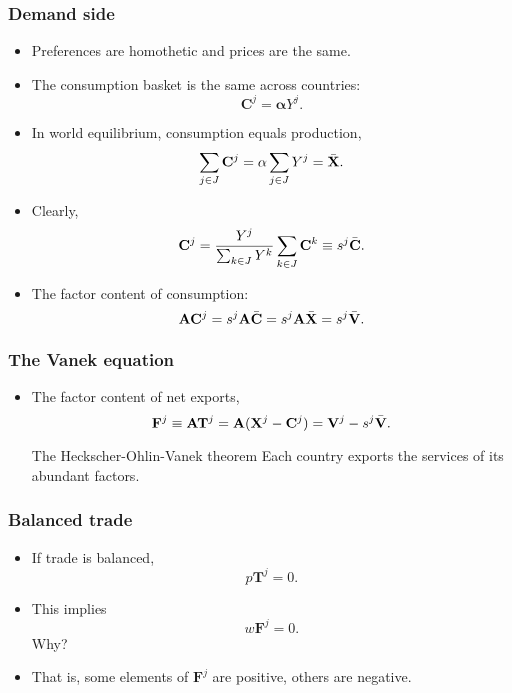 \documentclass[compress,mathserif,aspectratio=169]{beamer}
\begin{document}
\begin{frame}\frametitle{Demand side}\hypertarget{Demand side}{}
\begin{itemize}
\item Preferences are homothetic and prices are the same.

\item The consumption basket is the same across countries:
\[
\mathbf C^j = \mathbf \alpha  Y^j.
\]

\item In world equilibrium, consumption equals production,
\[
\sum_{j\in J} \mathbf C^j = \mathbf \alpha \sum_{j\in J}Y^j = \Bar {\mathbf X}.
\]

\item Clearly,
\[
\mathbf C^j = \frac{Y^j}{\sum_{k\in J}Y^k}\sum_{k\in J} \mathbf C^k
\equiv s^j\Bar {\mathbf C}.
\]

\item The factor content of consumption:
\[
\mathbf A\mathbf C^j = s^j \mathbf A\Bar {\mathbf C} = s^j \mathbf A\Bar {\mathbf X} = s^j \Bar {\mathbf  V}.
\]


\end{itemize}
\end{frame}



\begin{frame}\frametitle{The Vanek equation}\hypertarget{The Vanek equation}{}
\begin{itemize}
\item The factor content of net exports,
\[
\mathbf F^j \equiv \mathbf A\mathbf T^j = \mathbf A(\mathbf X^j-\mathbf C^j) = \mathbf V^j-s^j\Bar {\mathbf V}.
\]
\begin{block}{The Heckscher-Ohlin-Vanek theorem}\hypertarget{The Heckscher-Ohlin-Vanek theorem}{}
Each country exports the services of its abundant factors.


\end{block}
\end{itemize}
\end{frame}



\begin{frame}\frametitle{Balanced trade}\hypertarget{Balanced trade}{}
\begin{itemize}
\item If trade is balanced,
\[
p\mathbf T^j = 0.
\]

\item This implies
\[
w\mathbf F^j = 0.
\]
Why?

\item That is, some elements of $\mathbf F^j$ are positive, others are negative.


\end{itemize}
\end{frame}
\end{document}
